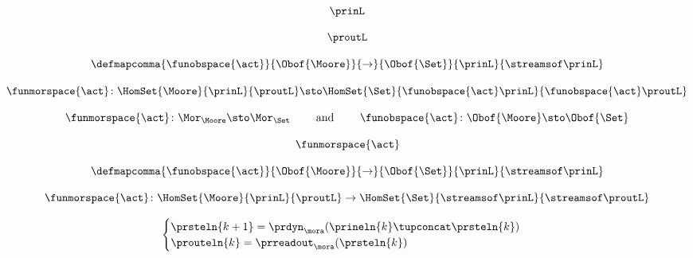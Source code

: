 \begin{forslides}
    \begin{equation}
        \label{eq:slides-processes-36}
        \prinL
    \end{equation}

    \begin{equation}
        \label{eq:slides-processes-37}
        \proutL
    \end{equation}

    \begin{equation}
        \label{eq:slides-processes-38}
        \defmapcomma{\funobspace{\act}}
        {\Obof{\Moore}}
        {\to}
        {\Obof{\Set}}
        {\prinL}
        {\streamsof\prinL}
    \end{equation}

    \begin{equation}
        \label{eq:slides-processes-39}
        \funmorspace{\act} \colon  \HomSet{\Moore}{\prinL}{\proutL} \sto \HomSet{\Set}{ \funobspace{\act}\prinL}{\funobspace{\act}\proutL}
    \end{equation}

    \begin{equation}
        \label{eq:slides-processes-40}
        \funmorspace{\act} \colon \Mor_\Moore \sto \Mor_\Set \qquad \text{ and } \qquad \funobspace{\act} \colon \Obof{\Moore} \sto \Obof{\Set}
    \end{equation}

    \begin{equation}
        \label{eq:slides-processes-41}
        \funmorspace{\act}
    \end{equation}

    \begin{equation}
        \label{eq:slides-processes-42}
        \defmapcomma{\funobspace{\act}}
        {\Obof{\Moore}}
        {\to}
        {\Obof{\Set}}
        {\prinL}
        {\streamsof\prinL}
    \end{equation}

    \begin{equation}
        \label{eq:slides-processes-43}
        \funmorspace{\act} \colon  \HomSet{\Moore}{\prinL}{\proutL} \to \HomSet{\Set}{\streamsof\prinL }{\streamsof\proutL}
    \end{equation}

    \begin{equation}
        \label{eq:slides-processes-44}
        \begin{cases}
            \prsteln{k+1} = \prdyn_\mora(\prineln{k} \tupconcat \prsteln{k}) \\
            \prouteln{k}   = \prreadout_\mora(\prsteln{k})
        \end{cases}
    \end{equation}


\end{forslides}
